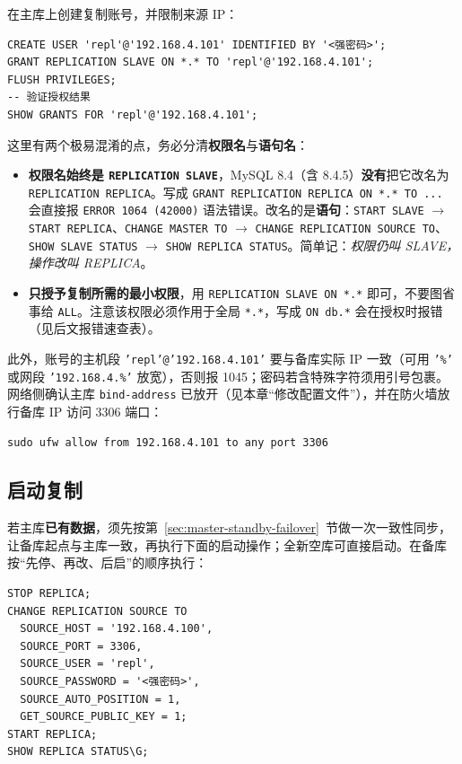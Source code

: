 \documentclass[12pt,UTF8]{ctexbook}
\begin{document}
在主库上创建复制账号，并限制来源 IP：

\begin{lstlisting}
CREATE USER 'repl'@'192.168.4.101' IDENTIFIED BY '<强密码>';
GRANT REPLICATION SLAVE ON *.* TO 'repl'@'192.168.4.101';
FLUSH PRIVILEGES;
-- 验证授权结果
SHOW GRANTS FOR 'repl'@'192.168.4.101';
\end{lstlisting}

这里有两个极易混淆的点，务必分清\textbf{权限名}与\textbf{语句名}：

\begin{itemize}[leftmargin=2cm]
  \item \textbf{权限名始终是 \texttt{REPLICATION SLAVE}}，MySQL 8.4（含 8.4.5）\textbf{没有}把它改名为 \texttt{REPLICATION REPLICA}。写成 \texttt{GRANT REPLICATION REPLICA ON *.* TO ...} 会直接报 \texttt{ERROR 1064 (42000)} 语法错误。改名的是\textbf{语句}：\texttt{START SLAVE} $\to$ \texttt{START REPLICA}、\texttt{CHANGE MASTER TO} $\to$ \texttt{CHANGE REPLICATION SOURCE TO}、\texttt{SHOW SLAVE STATUS} $\to$ \texttt{SHOW REPLICA STATUS}。简单记：\emph{权限仍叫 SLAVE，操作改叫 REPLICA}。
  \item \textbf{只授予复制所需的最小权限}，用 \texttt{REPLICATION SLAVE ON *.*} 即可，不要图省事给 \texttt{ALL}。注意该权限必须作用于全局 \texttt{*.*}，写成 \texttt{ON db.*} 会在授权时报错（见后文报错速查表）。
\end{itemize}

此外，账号的主机段 \texttt{'repl'@'192.168.4.101'} 要与备库实际 IP 一致（可用 \texttt{'\%'} 或网段 \texttt{'192.168.4.\%'} 放宽），否则报 1045；密码若含特殊字符须用引号包裹。网络侧确认主库 \texttt{bind-address} 已放开（见本章“修改配置文件”），并在防火墙放行备库 IP 访问 3306 端口：

\begin{lstlisting}
sudo ufw allow from 192.168.4.101 to any port 3306
\end{lstlisting}

\subsection{启动复制}

若主库\textbf{已有数据}，须先按第~\ref{sec:master-standby-failover}~节做一次一致性同步，让备库起点与主库一致，再执行下面的启动操作；全新空库可直接启动。在备库按“先停、再改、后启”的顺序执行：

\begin{lstlisting}
STOP REPLICA;
CHANGE REPLICATION SOURCE TO
  SOURCE_HOST = '192.168.4.100',
  SOURCE_PORT = 3306,
  SOURCE_USER = 'repl',
  SOURCE_PASSWORD = '<强密码>',
  SOURCE_AUTO_POSITION = 1,
  GET_SOURCE_PUBLIC_KEY = 1;
START REPLICA;
SHOW REPLICA STATUS\G;
\end{lstlisting}
\end{document}
